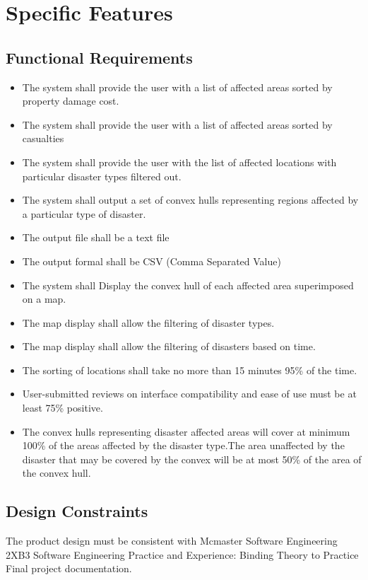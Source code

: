 \documentclass{article}
\begin{document}
 
\section{Specific Features}

\subsection{Functional Requirements}
    \begin{itemize}
        \item The system shall provide the user with a list of affected areas sorted by property damage cost.
        \item The system shall provide the user with a list of affected areas sorted by casualties
        \item The system shall provide the user with the list of affected locations with particular disaster types filtered out.
        \item The system shall output a set of convex hulls representing regions affected by a particular type of disaster.
        \item The output file shall be a text file
        \item The output formal shall be CSV (Comma Separated Value)
        \item The system shall Display the convex hull of each affected area superimposed on a map.
        \item The map display shall allow the filtering of disaster types.
        \item The map display shall allow the filtering of disasters based on time.
        \item The sorting of locations shall take no more than 15 minutes 95\% of the time.
        \item User-submitted reviews on interface compatibility and ease of use must be at least 75\% positive.
        \item The convex hulls representing disaster affected areas will cover at minimum 100\% of the areas affected by the disaster type.The area unaffected by the disaster that may be covered by the convex will be at most 50\% of the area of the convex hull.
    
    \end{itemize}
    \subsection{Design Constraints}
    The product design must be consistent with Mcmaster Software Engineering 
    2XB3 Software Engineering Practice and Experience: Binding Theory to Practice 
    Final project documentation.
    
\end{document}
